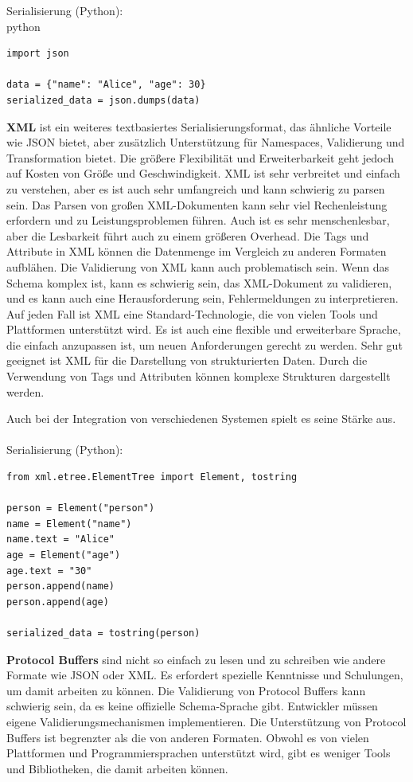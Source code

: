 \documentclass[../vs-script-first-v01.tex]{subfiles}
\begin{document}
Serialisierung (Python):\\
python\\
\begin{lstlisting}[caption={JSON},captionpos=b,label={lst:json}]
import json

data = {"name": "Alice", "age": 30}
serialized_data = json.dumps(data)

\end{lstlisting}
\textbf{XML} ist ein weiteres textbasiertes Serialisierungsformat, das ähnliche Vorteile wie JSON bietet, aber zusätzlich Unterstützung für Namespaces, Validierung und Transformation bietet. Die größere Flexibilität und Erweiterbarkeit geht jedoch auf Kosten von Größe und Geschwindigkeit.
XML ist sehr verbreitet und einfach zu verstehen, aber es ist auch sehr umfangreich und kann schwierig zu parsen sein. Das Parsen von großen XML-Dokumenten kann sehr viel Rechenleistung erfordern und zu Leistungsproblemen führen.
Auch ist es sehr menschenlesbar, aber die Lesbarkeit führt auch zu einem größeren Overhead. Die Tags und Attribute in XML können die Datenmenge im Vergleich zu anderen Formaten aufblähen. Die Validierung von XML kann auch problematisch sein. Wenn das Schema komplex ist, kann es schwierig sein, das XML-Dokument zu validieren, und es kann auch eine Herausforderung sein, Fehlermeldungen zu interpretieren. Auf jeden Fall ist XML eine Standard-Technologie, die von vielen Tools und Plattformen unterstützt wird. Es ist auch eine flexible und erweiterbare Sprache, die einfach anzupassen ist, um neuen Anforderungen gerecht zu werden.
Sehr gut geeignet ist XML für die Darstellung von strukturierten Daten. Durch die Verwendung von Tags und Attributen können komplexe Strukturen dargestellt werden.

Auch bei der Integration von verschiedenen Systemen spielt es seine Stärke aus.\\\\

Serialisierung (Python):\\
\begin{lstlisting}[caption={XML},captionpos=b,label={lst:xml}]
from xml.etree.ElementTree import Element, tostring

person = Element("person")
name = Element("name")
name.text = "Alice"
age = Element("age")
age.text = "30"
person.append(name)
person.append(age)

serialized_data = tostring(person)
\end{lstlisting}
\textbf{Protocol Buffers} sind nicht so einfach zu lesen und zu schreiben wie andere Formate wie JSON oder XML. Es erfordert spezielle Kenntnisse und Schulungen, um damit arbeiten zu können. Die Validierung von Protocol Buffers kann schwierig sein, da es keine offizielle Schema-Sprache gibt. Entwickler müssen eigene Validierungsmechanismen implementieren. Die Unterstützung von Protocol Buffers ist begrenzter als die von anderen Formaten. Obwohl es von vielen Plattformen und Programmiersprachen unterstützt wird, gibt es weniger Tools und Bibliotheken, die damit arbeiten können.
\end{document}
